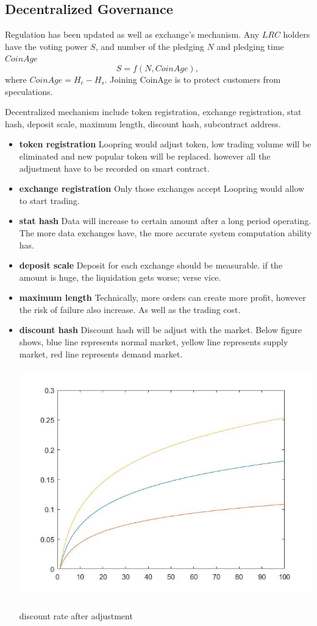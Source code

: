 \documentclass[UTF8,nofonts]{article}
\makeatletter
\newenvironment{figurehere}
 {\def\@captype{figure}}
 {}
\makeatother
\begin{document}
\subsection{Decentralized Governance}
Regulation has been updated as well as exchange's mechanism. Any $LRC$ holders have the voting power $S$, and number of the pledging $N$ and pledging time $CoinAge$
$$S = f(N,  CoinAge)\text{, }$$
where $CoinAge = H_{c}-H_{s}$. Joining CoinAge is to protect customers from speculations.

Decentralized mechanism include token registration, exchange registration, stat hash, deposit scale, maximum length, discount hash, subcontract address.
 \begin{itemize}
   \item \textbf{token registration} Loopring would adjust token,  low trading volume will be eliminated and new popular token will be replaced. however all the adjustment have to be recorded on smart contract.
  \item \textbf{exchange registration} Only those exchanges accept Loopring would allow to start trading.
   \item \textbf{stat hash} Data will increase to certain amount after a long period operating. The more data exchanges have,  the more accurate system computation ability has.
  \item \textbf{deposit scale} Deposit for each exchange should be measurable. if the amount is huge,  the liquidation gets worse; verse vice.
   \item \textbf{maximum length} Technically, more orders can create more profit,  however the risk of failure also increase. As well as the trading cost.
   \item \textbf{discount hash} Discount hash will be adjust with the market. Below figure shows, blue line represents normal market, yellow line represents supply market, red line represents demand market.
\begin{center}
\begin{figurehere}
\includegraphics[height=10cm]{images/rate_adjust.jpg}
\caption{discount rate after adjustment}
\label{fig: dischargeRateAdjust}
\end{figurehere}
\end{center}


\end{itemize}
\end{document}
